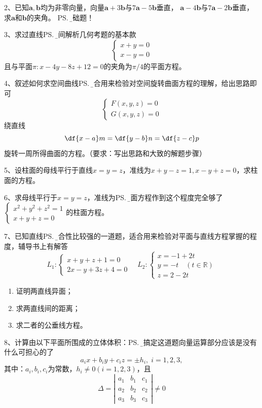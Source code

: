 2、已知$\bm{a},\bm{b}$均为非零向量，向量$\bm{a}+3\bm{b}$与$7\bm{a}-5\bm{b}$垂直，
$\bm{a}-4\bm{b}$与$7\bm{a}-2\bm{b}$垂直，求$\bm{a}$和$\bm{b}$的夹角。
\ps{\b 基础题！}

3、求过直线\ps{\b 空间解析几何考题的基本款}
$$\left\{\begin{array}{l}
	x+y=0\\
	x-y=0
\end{array}\right.$$
且与平面$\pi:x-4y-8z+12=0$的夹角为$\pi/4$的平面方程。

4、叙述如何求空间曲线\ps{\b 适合用来检验对空间旋转曲面方程的理解，给出思路即可}
$$\left\{\begin{array}{l}
F(x,y,z)=0\\ G(x,y,z)=0
\end{array}\right.$$绕直线
$$\df{x-a}m=\df{y-b}n=\df{z-c}p$$
旋转一周所得曲面的方程。（要求：写出思路和大致的解题步骤）

5、设柱面的母线平行于直线$x=y=z$，准线为$x+y-z=1,x-y+z=0$，求柱面的方程。

6、求母线平行于$x=y=z$，准线为\ps{\b 柱面方程作到这个程度完全够了}
$\left\{\begin{array}{l}
	x^2+y^2+z^2=1\\ x+y+z=0
\end{array}\right.$的柱面方程。

7、已知直线\ps{\b 综合性比较强的一道题，适合用来检验对平面与直线方程掌握的程度，辅导书上有解答}
$$L_1:\left\{\begin{array}{l}
	x+y+z+1=0\\
	2x-y+3z+4=0
\end{array}\right.
\quad
L_2:\left\{\begin{array}{l}
	x=-1+2t\\
	y=-t\quad(t\in\mathbb{R})\\
	z=2-2t
\end{array}\right.
$$
\begin{enumerate}[(1)]
  \setlength{\itemindent}{1cm}
  \item 证明两直线异面；
  \item 求两直线间的距离；
  \item 求二者的公垂线方程。
\end{enumerate}

8、计算由以下平面所围成的立体体积：\ps{\b 能搞定这道题向量运算部分应该是没有什么可担心的了}
$$a_ix+b_iy+c_iz=\pm h_i,\;i=1,2,3,$$
其中：$a_i,b_i,c_i$为常数，$h_i\ne0(i=1,2,3)$，且
$$\Delta=\left|\begin{array}{ccc}
a_1 & b_1 & c_1\\ a_2 & b_2 & c_2 \\ a_3 & b_3 & c_3
\end{array}\right|\ne 0$$

